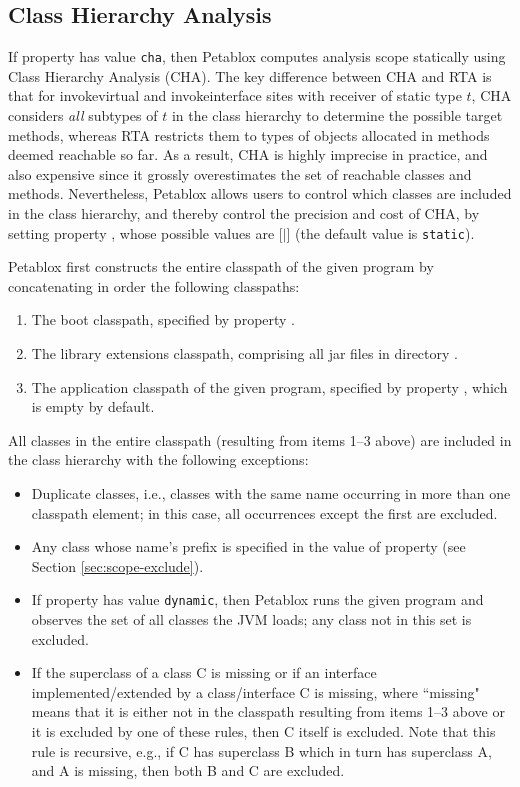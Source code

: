 \subsection{Class Hierarchy Analysis}

If property  has value {\tt cha}, then Petablox
computes analysis scope statically using Class Hierarchy Analysis (CHA).
The key difference between CHA and RTA is that for invokevirtual and
invokeinterface sites with receiver of static type $t$, CHA considers
{\it all} subtypes of $t$ in the class hierarchy to determine the
possible target methods, whereas RTA restricts them to types of
objects allocated in methods deemed reachable so far.  As a result,
CHA is highly imprecise in practice, and also expensive since it
grossly overestimates the set of reachable classes and methods.
Nevertheless, Petablox allows users to control which classes are
included in the class hierarchy, and thereby control the
precision and cost of CHA, by setting property ,
whose possible values are [$|$] (the default
value is {\tt static}).

Petablox first constructs the entire classpath of the given program by
concatenating in order the following classpaths:

\begin{enumerate}
\item
The boot classpath, specified by property .
\item
The library extensions classpath, comprising all jar files in
directory .
\item
The application classpath of the given program, specified by property ,
which is empty by default.
\end{enumerate}

All classes in the entire classpath (resulting from items 1--3 above)
are included in the class hierarchy with the following exceptions:
\begin{itemize}
\item
Duplicate classes, i.e., classes with the same name occurring in more
than one classpath element; in this case, all occurrences except the
first are excluded.
\item
Any class whose name's prefix is specified in the value of property
 (see Section \ref{sec:scope-exclude}).
\item
If property  has value {\tt dynamic}, then
Petablox runs the given program and observes the set of all classes the
JVM loads; any class not in this set is excluded.
\item
If the superclass of a class C is missing or if an interface
implemented/extended by a class/interface C is missing, where
``missing" means that it is either not in the classpath resulting from
items 1--3 above or it is excluded by one of these rules, then C
itself is excluded.  Note that this rule is recursive, e.g., if C has
superclass B which in turn has superclass A, and A is missing, then
both B and C are excluded.
\end{itemize}

